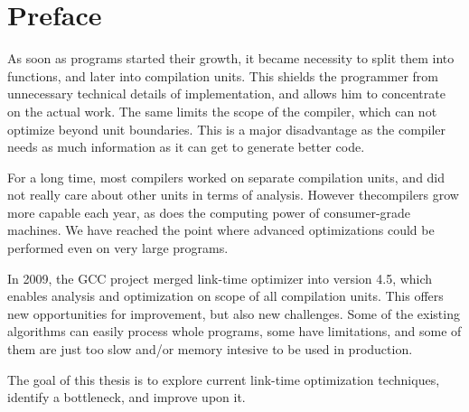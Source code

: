 \chapter*{Preface}

%
%
%
%

As soon as programs started their growth, it became necessity to split them into
functions, and later into compilation units. This shields the programmer from
unnecessary technical details of implementation, and allows him to concentrate on
the actual work. The same limits the scope of the compiler, which can not
optimize beyond unit boundaries.  This is a major disadvantage as the compiler
needs as much information as it can get to generate better code.

For a long time, most compilers worked on separate compilation units, and did not
really care about other units in terms of analysis.  However  thecompilers grow
more capable each year, as does the computing power of consumer-grade machines.
We have reached the point where advanced optimizations could be performed even
on very large programs.

In 2009, the GCC project merged link-time optimizer into version 4.5, which enables
analysis and optimization on scope of all compilation units. This offers new
opportunities for improvement, but also new challenges. Some of the existing
algorithms can easily process whole programs, some have limitations, and some
of them are just too slow and/or memory intesive to be used in production.

The goal of this thesis is to explore current link-time optimization
techniques, identify a bottleneck, and improve upon it. 


